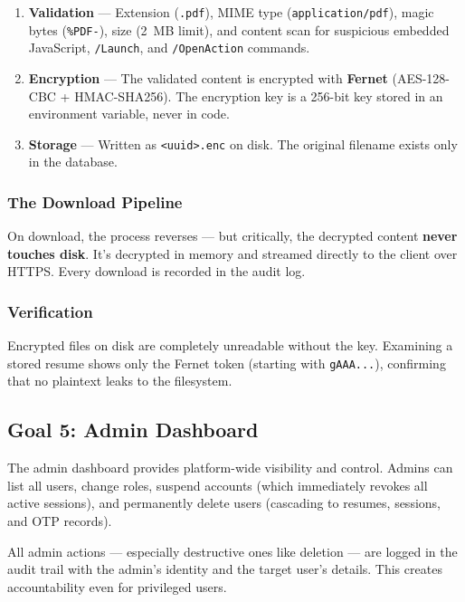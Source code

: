 \begin{enumerate}
    \item \textbf{Validation} — Extension (\texttt{.pdf}), MIME type (\texttt{application/pdf}), magic bytes (\texttt{\%PDF-}), size (2~MB limit), and content scan for suspicious embedded JavaScript, \texttt{/Launch}, and \texttt{/OpenAction} commands.
    \item \textbf{Encryption} — The validated content is encrypted with \textbf{Fernet} (AES-128-CBC + HMAC-SHA256). The encryption key is a 256-bit key stored in an environment variable, never in code.
    \item \textbf{Storage} — Written as \texttt{<uuid>.enc} on disk. The original filename exists only in the database.
\end{enumerate}

\subsubsection{The Download Pipeline}

On download, the process reverses — but critically, the decrypted content \textbf{never touches disk}. It's decrypted in memory and streamed directly to the client over HTTPS. Every download is recorded in the audit log.

\subsubsection{Verification}

Encrypted files on disk are completely unreadable without the key. Examining a stored resume shows only the Fernet token (starting with \texttt{gAAA...}), confirming that no plaintext leaks to the filesystem.

\subsection{Goal 5: Admin Dashboard}

The admin dashboard provides platform-wide visibility and control. Admins can list all users, change roles, suspend accounts (which immediately revokes all active sessions), and permanently delete users (cascading to resumes, sessions, and OTP records).

All admin actions — especially destructive ones like deletion — are logged in the audit trail with the admin's identity and the target user's details. This creates accountability even for privileged users.


